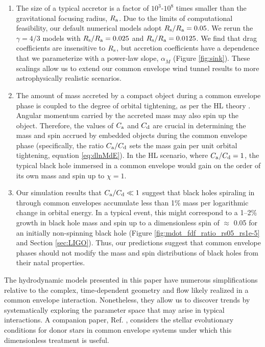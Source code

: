 \begin{enumerate}
\item The size of a typical accretor is a factor of $10^3$-$10^8$ times smaller than the gravitational focusing radius, $R_{\rm a}$. Due to the limits of computational feasibility, our default numerical models adopt $R_{\rm s}/ R_{\rm a}=0.05$. We rerun the $\gamma=4/3$ models with $R_{\rm s}/ R_{\rm a}=0.025$ and $R_{\rm s}/ R_{\rm a}=0.0125$. We find that drag coefficients are insensitive to $R_{\rm s}$, but accretion coefficients have a dependence that we parameterize with a power-law slope, $\alpha_{\dot M}$ (Figure \ref{fig:sink}).
These scalings allow us to extend our common envelope wind tunnel results to more astrophysically realistic scenarios.

\item The amount of mass accreted by a compact object during a common envelope phase is coupled to the degree of orbital tightening, as per the HL theory \cite[and Section \ref{sec:coupled}]{Chevalier:1993,Brown:1995,Bethe:1998}. Angular momentum carried by the accreted mass may also spin up the object. Therefore, the values of $C_{\rm a}$ and $C_{\rm d}$ are crucial in determining the mass and spin accrued by embedded objects during the common envelope phase (specifically, the ratio $C_{\rm a}/C_{\rm d}$ sets the mass gain per unit orbital tightening, equation \eqref{eq:dlnMdE}). In the HL scenario, where $C_{\rm a}/C_{\rm d}=1$, the typical black hole immersed in a common envelope would gain on the order of its own mass and spin up to $\chi=1$.

\item Our simulation results that $C_{\rm a}/C_{\rm d} \ll 1$ suggest that black holes spiraling in through common envelopes accumulate less than 1\% mass per logarithmic change in orbital energy. In a typical event, this might correspond to a 1--2\% growth in black hole mass and spin up to a dimensionless spin of $\approx$ 0.05 for an initially non-spinning black hole (Figure \ref{fig:mdot_fdf_ratio_rs05_rs1e-5} and Section \ref{sec:LIGO}). Thus, our predictions suggest that common envelope phases should not modify the mass and spin distributions of black holes from their natal properties.
\vspace{0.5cm}
\end{enumerate}

The hydrodynamic models presented in this paper have numerous simplifications relative to the complex, time-dependent geometry and flow likely realized in a common envelope interaction. Nonetheless, they allow us to discover trends by systematically exploring the parameter space that may arise in typical interactions. A companion paper, Ref. \cite{Everson:2020eeq}, considers the stellar evolutionary conditions for donor stars in common envelope systems under which this dimensionless treatment is useful. 

